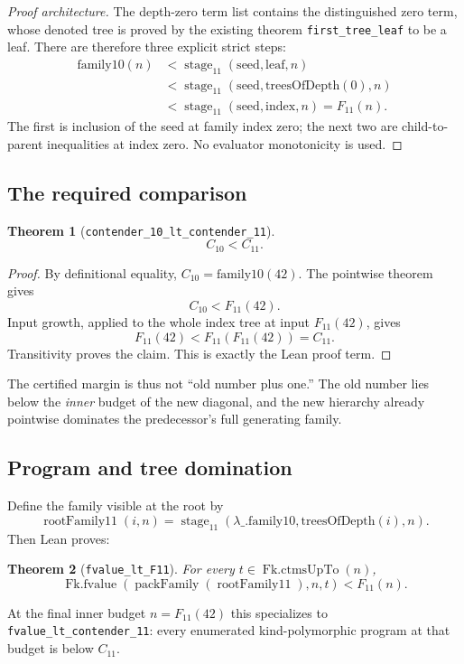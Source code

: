 \documentclass[11pt]{article}
\newtheorem{theorem}{Theorem}[section]
\theoremstyle{definition}
\theoremstyle{remark}
\newcommand{\Cten}{C_{10}}
\newcommand{\Celeven}{C_{11}}
\newcommand{\lean}[1]{\texttt{#1}}
\begin{document}
\begin{proof}[Proof architecture]
The depth-zero term list contains the distinguished zero term, whose denoted
tree is proved by the existing theorem \lean{first\_tree\_leaf} to be a leaf.
There are therefore three explicit strict steps:
\[
\begin{aligned}
 \mathrm{family10}(n)
 &<\operatorname{stage}_{11}(\mathrm{seed},\mathrm{leaf},n)\\
 &<\operatorname{stage}_{11}(\mathrm{seed},\mathrm{treesOfDepth}(0),n)\\
 &<\operatorname{stage}_{11}(\mathrm{seed},\mathrm{index},n)=F_{11}(n).
\end{aligned}
\]
The first is inclusion of the seed at family index zero; the next two are
child-to-parent inequalities at index zero.  No evaluator monotonicity is used.
\end{proof}

\subsection{The required comparison}

\begin{theorem}[\lean{contender\_10\_lt\_contender\_11}]
\[
   \Cten<\Celeven.
\]
\end{theorem}

\begin{proof}
By definitional equality, $\Cten=\mathrm{family10}(42)$.  The pointwise theorem
gives
\[
  \Cten<F_{11}(42).
\]
Input growth, applied to the whole index tree at input $F_{11}(42)$, gives
\[
  F_{11}(42)<F_{11}(F_{11}(42))=\Celeven.
\]
Transitivity proves the claim.  This is exactly the Lean proof term.
\end{proof}

The certified margin is thus not ``old number plus one.''  The old number lies
below the \emph{inner} budget of the new diagonal, and the new hierarchy already
pointwise dominates the predecessor's full generating family.

\subsection{Program and tree domination}

Define the family visible at the root by
\[
  \operatorname{rootFamily11}(i,n)
   =\operatorname{stage}_{11}
      (\lambda\_.\mathrm{family10},\mathrm{treesOfDepth}(i),n).
\]
Then Lean proves:
\begin{theorem}[\lean{fvalue\_lt\_F11}]
For every $t\in\operatorname{Fk.ctmsUpTo}(n)$,
\[
 \operatorname{Fk.fvalue}
   (\operatorname{packFamily}(\operatorname{rootFamily11}),n,t)
 <F_{11}(n).
\]
\end{theorem}
At the final inner budget $n=F_{11}(42)$ this specializes to
\lean{fvalue\_lt\_contender\_11}: every enumerated kind-polymorphic program at
that budget is below $\Celeven$.
\end{document}
